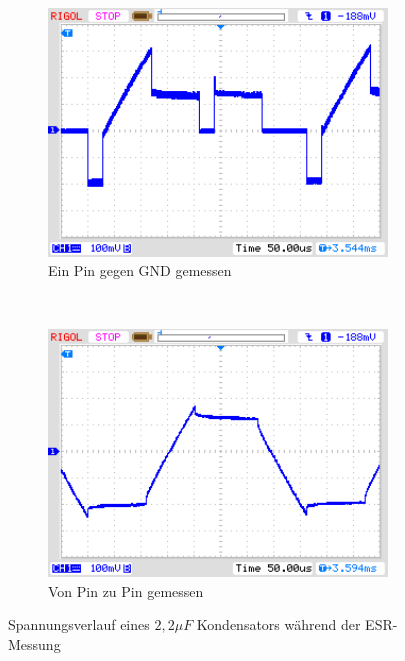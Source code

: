 \begin{figure}[H]
  \begin{subfigure}[b]{9cm}
    \centering
    \includegraphics[width=9cm]{../PNG/ESR_2uF_pin2GND.png}
    \caption{Ein Pin gegen GND gemessen}
  \end{subfigure}
  ~
  \begin{subfigure}[b]{9cm}
    \centering
    \includegraphics[width=9cm]{../PNG/ESR_2uF_pin2pin.png}
    \caption{Von Pin zu Pin gemessen}
  \end{subfigure}
  \caption{Spannungsverlauf eines \(2,2\mu F\) Kondensators während der ESR-Messung}
  \label{pic:esr2}
\end{figure}

